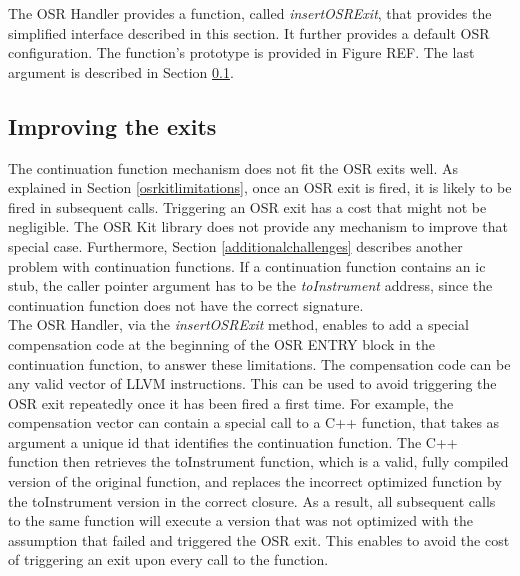 The OSR Handler provides a function, called \textit{insertOSRExit}, that provides the simplified interface described in this section.
It further provides a default OSR configuration.
The function's prototype is provided in Figure REF.
The last argument is described in Section \ref{improvingexits}.\\


\subsection{Improving the exits}\label{improvingexits}

The continuation function mechanism does not fit the OSR exits well.
As explained in Section \ref{osrkitlimitations}, once an OSR exit is fired, it is likely to be fired in subsequent calls.
Triggering an OSR exit has a cost that might not be negligible.
The OSR Kit\cite{OSRKit} library does not provide any mechanism to improve that special case.
Furthermore, Section \ref{additionalchallenges} describes another problem with continuation functions.
If a continuation function contains an ic stub, the caller pointer argument has to be the \textit{toInstrument} address, since the continuation function does not have the correct signature.\\

The OSR Handler, via the \textit{insertOSRExit} method, enables to add a special compensation code at the beginning of the OSR ENTRY block in the continuation function, to answer these limitations.
The compensation code can be any valid vector of LLVM instructions.
This can be used to avoid triggering the OSR exit repeatedly once it has been fired a first time.
For example, the compensation vector can contain a special call to a C++ function, that takes as argument a unique id that identifies the continuation function. 
The C++ function then retrieves the toInstrument function, which is a valid, fully compiled version of the original function, and replaces the incorrect optimized function by the toInstrument version in the correct closure.
As a result, all subsequent calls to the same function will execute a version that was not optimized with the assumption that failed and triggered the OSR exit.
This enables to avoid the cost of triggering an exit upon every call to the function.\\


